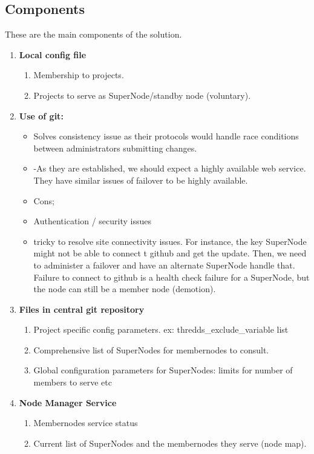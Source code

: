 \documentclass[oneside,12pt]{memoir}
\begin{document}
\subsection{Components}
\label{stow}

These are the main components of the solution.
\begin{enumerate}
\item
\textbf{Local config file} 
\begin{enumerate}
\item Membership to projects.
\item Projects to serve as SuperNode/standby node (voluntary).


\end{enumerate}

\item
\textbf{Use of git:  }

\begin{itemize}
\item
Solves consistency issue as their protocols would handle race conditions between administrators submitting changes. 
\item
-As they are established, we should expect a highly available web service.  They have similar issues of failover to be highly available.
\item
Cons;
\item
 Authentication / security issues
 \item
 tricky to resolve site connectivity issues.  For instance, the key SuperNode might not be able to connect t github and get the update.  Then, we need to administer a failover and have an alternate SuperNode handle that.  Failure to connect to github is a health check failure for a SuperNode, but the node can still be a member node (demotion).  
\end{itemize}



\item \textbf{Files in central git repository}
\begin{enumerate}
\item Project specific config parameters. ex: thredds\_exclude\_variable list
\item Comprehensive list of SuperNodes for membernodes to consult.
\item Global configuration parameters for SuperNodes: limits for number of members to serve etc
\end{enumerate}
\item \textbf{Node Manager Service}
\begin{enumerate}
\item Membernodes service status
\item Current list of SuperNodes and the membernodes they serve (node map).
\end{enumerate}


\end{enumerate}
\end{document}
